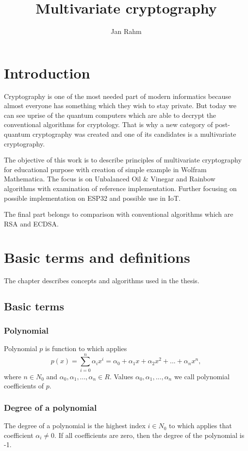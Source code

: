 \documentclass[thesis=M,english]{FITthesis}[2019/12/23]
\title{Multivariate cryptography}
\author{Jan Rahm} %
\begin{document}

\chapter{Introduction}
Cryptography is one of the most needed part of modern informatics because almost everyone has something which they wish to stay private. But today we can see uprise of the quantum computers which are able to decrypt the conventional algorithms for cryptology. That is why a new category of post-quantum cryptography was created and one of its candidates is a multivariate cryptography.

The objective of this work is to describe principles of multivariate cryptography for educational purpose with creation of simple example in Wolfram Mathematica. The focus is on Unbalanced Oil \& Vinegar and Rainbow algorithms with examination of reference implementation. Further focusing on possible implementation on ESP32 and possible use in IoT.

The final part belongs to comparison with conventional algorithms which are RSA and ECDSA.

\chapter{Basic terms and definitions}
The chapter describes concepts and algorithms used in the thesis.

\section{Basic terms}
\subsection{Polynomial}
Polynomial $p$ is function to which applies
\[
	p(x) = \sum\limits_{i=0}^n {\alpha_ix^i} = \alpha_0 + \alpha_1x + \alpha_2x^2 + ... + \alpha_nx^n,
\]
where $n \in N_0$ and $\alpha_0, \alpha_1, ..., \alpha_n \in R$. Values $\alpha_0, \alpha_1, ..., \alpha_n$ we call polynomial coefficients of $p$.  

\subsection{Degree of a polynomial}
The degree of a polynomial is the highest index $i \in N_0$ to which applies that coefficient $\alpha_i \ne 0$. If all coefficients are zero, then the degree of the polynomial is -1.
\end{document}
